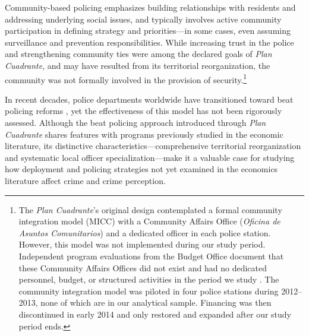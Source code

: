 Community-based policing emphasizes building relationships with residents and addressing underlying social issues, and typically involves active community participation in defining strategy and priorities---in some cases, even assuming surveillance and prevention responsibilities. While increasing trust in the police and strengthening community ties were among the declared goals of \emph{Plan Cuadrante}, and may have resulted from its territorial reorganization, the community was not formally involved in the provision of security.\footnote{The \emph{Plan Cuadrante}'s original design contemplated a formal community integration model (MICC) with a Community Affairs Office (\textit{Oficina de Asuntos Comunitarios}) and a dedicated officer in each police station. However, this model was not implemented during our study period. Independent program evaluations from the Budget Office document that these Community Affairs Offices did not exist and had no dedicated personnel, budget, or structured activities in the period we study \citep{DIPRES2007_largo,DIPRES2014}. The community integration model was piloted in four police stations during 2012--2013, none of which are in our analytical sample. Financing was then discontinued in early 2014 and only restored and expanded after our study period ends.}%

In recent decades, police departments worldwide have transitioned toward beat policing reforms \citep{NASEM2018,PCSP2014}, yet the effectiveness of this model has not been rigorously assessed. Although the beat policing approach introduced through \emph{Plan Cuadrante} shares features with programs previously studied in the economic literature, its distinctive characteristics---comprehensive territorial reorganization and systematic local officer specialization---make it a valuable case for studying how deployment and policing strategies not yet examined in the economics literature affect crime and crime perception.

